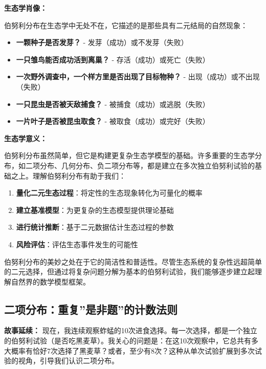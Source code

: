 \documentclass[
]{book}
\providecommand{\tightlist}{%
  \setlength{\itemsep}{0pt}\setlength{\parskip}{0pt}}
\begin{document}
\textbf{生态学肖像：}

伯努利分布在生态学中无处不在，它描述的是那些具有二元结局的自然现象：

\begin{itemize}
\tightlist
\item
  \textbf{一颗种子是否发芽？} - 发芽（成功）或不发芽（失败）
\item
  \textbf{一只雏鸟能否成功活到离巢？} - 存活（成功）或死亡（失败）
\item
  \textbf{一次野外调查中，一个样方里是否出现了目标物种？} - 出现（成功）或不出现（失败）
\item
  \textbf{一只昆虫是否被天敌捕食？} - 被捕食（成功）或逃脱（失败）
\item
  \textbf{一片叶子是否被昆虫取食？} - 被取食（成功）或完好（失败）
\end{itemize}

\textbf{生态学意义：}

伯努利分布虽然简单，但它是构建更复杂生态学模型的基础。许多重要的生态学分布，如二项分布、几何分布、负二项分布等，都是建立在多次独立伯努利试验的基础之上。理解伯努利分布有助于我们：

\begin{enumerate}
\def\labelenumi{\arabic{enumi}.}
\tightlist
\item
  \textbf{量化二元生态过程}：将定性的生态现象转化为可量化的概率
\item
  \textbf{建立基准模型}：为更复杂的生态模型提供理论基础
\item
  \textbf{进行统计推断}：基于二元数据估计生态过程的参数
\item
  \textbf{风险评估}：评估生态事件发生的可能性
\end{enumerate}

伯努利分布的美妙之处在于它的简洁性和普适性。尽管生态系统的复杂性远超简单的二元选择，但通过将复杂问题分解为基本的伯努利试验，我们能够逐步建立起理解自然界的数学模型框架。

\hypertarget{ux4e8cux9879ux5206ux5e03ux91cdux590dux662fux975eux9898ux7684ux8ba1ux6570ux6cd5ux5219}{%
\subsection{二项分布：重复''是非题''的计数法则}\label{ux4e8cux9879ux5206ux5e03ux91cdux590dux662fux975eux9898ux7684ux8ba1ux6570ux6cd5ux5219}}

\textbf{故事延续：} 现在，我连续观察蚱蜢的10次进食选择。每一次选择，都是一个独立的伯努利试验（是否吃黑麦草）。我关心的问题是：在这10次观察中，它总共有多大概率有恰好7次选择了黑麦草？或者，至少有8次？这种从单次试验扩展到多次试验的视角，引导我们认识二项分布。
\end{document}
